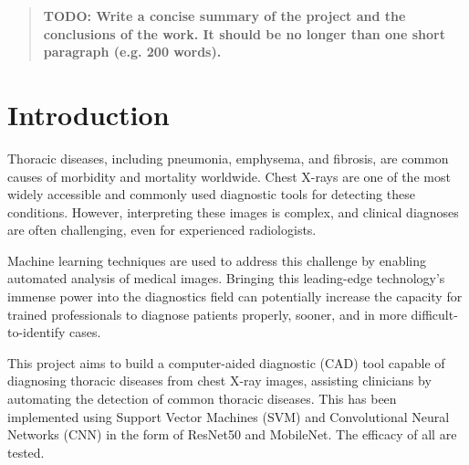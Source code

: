 \documentclass{article}
\theoremstyle{plain}
\theoremstyle{definition}
\theoremstyle{remark}
\begin{document}


\begin{abstract}
    \textbf{TODO: Write a concise summary of the project and the conclusions of the work. It should be no longer
    than one short paragraph (e.g. 200 words).}
\end{abstract}


\section{Introduction}
Thoracic diseases, including pneumonia, emphysema, and fibrosis, are common causes of morbidity and
mortality worldwide. Chest X-rays are one of the most widely accessible and commonly used diagnostic
tools for detecting these conditions. However, interpreting these images is complex, and clinical
diagnoses are often challenging, even for experienced radiologists.

Machine learning techniques are used to address this challenge by enabling automated analysis of
medical images. Bringing this leading-edge technology's immense power into the diagnostics field can
potentially increase the capacity for trained professionals to diagnose patients properly, sooner,
and in more difficult-to-identify cases.

This project aims to build a computer-aided diagnostic (CAD) tool capable of diagnosing thoracic
diseases from chest X-ray images, assisting clinicians by automating the detection of common thoracic
diseases. This has been implemented using Support Vector Machines (SVM) and Convolutional Neural Networks
(CNN) in the form of ResNet50 and MobileNet. The efficacy of all are tested.

\end{document}
